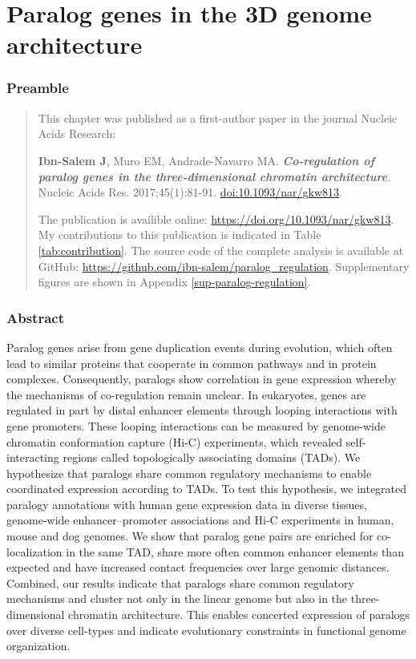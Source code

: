 \documentclass[a4paper,twoside=true,openright,parskip=full,chapterprefix=true,11pt,headings=normal,bibliography=totoc,listof=totoc,titlepage=on,captions=tableabove,draft=false]{scrreprt}
\theoremstyle{definition}
\theoremstyle{definition}
\theoremstyle{definition}
\theoremstyle{remark}
\begin{document}
\hypertarget{paralog-regulation}{%
\chapter{Paralog genes in the 3D genome
architecture}\label{paralog-regulation}}

\hypertarget{preamble}{%
\subsection*{Preamble}\label{preamble}}

\begin{quote}
This chapter was published as a first-author paper in the journal
Nucleic Acids Research:

\textbf{Ibn-Salem J}, Muro EM, Andrade-Navarro MA.
\textbf{\emph{Co-regulation of paralog genes in the three-dimensional
chromatin architecture}}. Nucleic Acids Res. 2017;45(1):81-91.
\href{https://doi.org/10.1093/nar/gkw813}{doi:10.1093/nar/gkw813}.

The publication is availible online:
\url{https://doi.org/10.1093/nar/gkw813}. My contributions to this
publication is indicated in Table \ref{tab:contribution}. The source
code of the complete analysis is available at GitHub:
\url{https://github.com/ibn-salem/paralog_regulation}. Supplementary
figures are shown in Appendix \ref{sup-paralog-regulation}.
\end{quote}

\hypertarget{abstract-1}{%
\subsection*{Abstract}\label{abstract-1}}

Paralog genes arise from gene duplication events during evolution, which
often lead to similar proteins that cooperate in common pathways and in
protein complexes. Consequently, paralogs show correlation in gene
expression whereby the mechanisms of co-regulation remain unclear. In
eukaryotes, genes are regulated in part by distal enhancer elements
through looping interactions with gene promoters. These looping
interactions can be measured by genome-wide chromatin conformation
capture (Hi-C) experiments, which revealed self-interacting regions
called topologically associating domains (TADs). We hypothesize that
paralogs share common regulatory mechanisms to enable coordinated
expression according to TADs. To test this hypothesis, we integrated
paralogy annotations with human gene expression data in diverse tissues,
genome-wide enhancer--promoter associations and Hi-C experiments in
human, mouse and dog genomes. We show that paralog gene pairs are
enriched for co-localization in the same TAD, share more often common
enhancer elements than expected and have increased contact frequencies
over large genomic distances. Combined, our results indicate that
paralogs share common regulatory mechanisms and cluster not only in the
linear genome but also in the three-dimensional chromatin architecture.
This enables concerted expression of paralogs over diverse cell-types
and indicate evolutionary constraints in functional genome organization.
\end{document}
